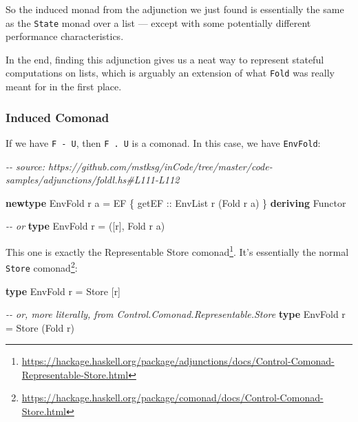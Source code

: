 \documentclass[]{article}
\newenvironment{Shaded}{}{}
\newcommand{\CommentTok}[1]{\textcolor[rgb]{0.38,0.63,0.69}{\textit{#1}}}
\newcommand{\DataTypeTok}[1]{\textcolor[rgb]{0.56,0.13,0.00}{#1}}
\newcommand{\KeywordTok}[1]{\textcolor[rgb]{0.00,0.44,0.13}{\textbf{#1}}}
\newcommand{\NormalTok}[1]{#1}
\newcommand{\OtherTok}[1]{\textcolor[rgb]{0.00,0.44,0.13}{#1}}
\renewcommand{\href}[2]{#2\footnote{\url{#1}}}
\begin{document}
So the induced monad from the adjunction we just found is essentially the same
as the \texttt{State} monad over a list --- except with some potentially
different performance characteristics.

In the end, finding this adjunction gives us a neat way to represent stateful
computations on lists, which is arguably an extension of what \texttt{Fold} was
really meant for in the first place.

\subsubsection{Induced Comonad}\label{induced-comonad}

If we have \texttt{F\ -\textbar{}\ U}, then \texttt{F\ .\ U} is a comonad. In
this case, we have \texttt{EnvFold}:

\begin{Shaded}
\begin{Highlighting}[]
\CommentTok{{-}{-} source: https://github.com/mstksg/inCode/tree/master/code{-}samples/adjunctions/foldl.hs\#L111{-}L112}

\KeywordTok{newtype} \DataTypeTok{EnvFold}\NormalTok{ r a }\OtherTok{=} \DataTypeTok{EF}\NormalTok{ \{}\OtherTok{ getEF ::} \DataTypeTok{EnvList}\NormalTok{ r (}\DataTypeTok{Fold}\NormalTok{ r a) \}}
  \KeywordTok{deriving} \DataTypeTok{Functor}

\CommentTok{{-}{-} or}
\KeywordTok{type} \DataTypeTok{EnvFold}\NormalTok{ r }\OtherTok{=}\NormalTok{ ([r], }\DataTypeTok{Fold}\NormalTok{ r a)}
\end{Highlighting}
\end{Shaded}

This one is exactly the
\href{https://hackage.haskell.org/package/adjunctions/docs/Control-Comonad-Representable-Store.html}{Representable
Store comonad}. It's essentially the normal
\href{https://hackage.haskell.org/package/comonad/docs/Control-Comonad-Store.html}{\texttt{Store}
comonad}:

\begin{Shaded}
\begin{Highlighting}[]
\KeywordTok{type} \DataTypeTok{EnvFold}\NormalTok{ r }\OtherTok{=} \DataTypeTok{Store}\NormalTok{ [r]}

\CommentTok{{-}{-} or, more literally, from Control.Comonad.Representable.Store}
\KeywordTok{type} \DataTypeTok{EnvFold}\NormalTok{ r }\OtherTok{=} \DataTypeTok{Store}\NormalTok{ (}\DataTypeTok{Fold}\NormalTok{ r)}
\end{Highlighting}
\end{Shaded}
\end{document}
